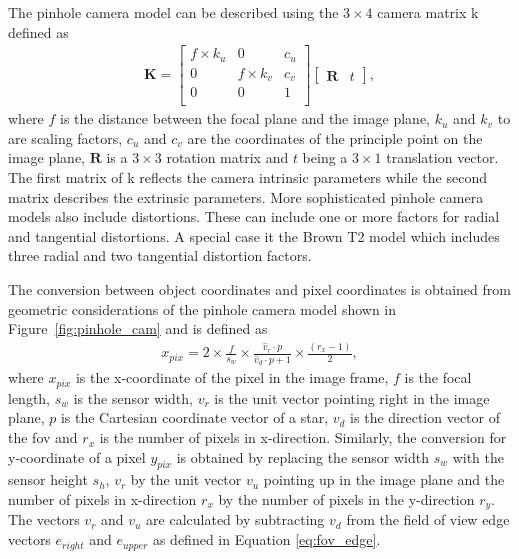 The pinhole camera model can be described using the $3\times4$ camera matrix \gls{k} defined as
\begin{align}
    \textbf{K} = \begin{bmatrix}
        f\times k_u & 0           & c_u \\
        0           & f\times k_v & c_v \\
        0           & 0           & 1   \\
    \end{bmatrix} 
    \begin{bmatrix}
        \textbf{R} & t
    \end{bmatrix}, \label{eq:camera_m}
\end{align}
where $f$ is the distance between the focal plane and the image plane, $k_u$ and $k_v$ to are scaling factors, $c_u$ and $c_v$ are the coordinates of the principle point on the image plane, $\textbf{R}$ is a $3\times3$ rotation matrix and $t$ being a $3\times1$ translation vector. The first matrix of \gls{k} reflects the camera intrinsic parameters while the second matrix describes the extrinsic parameters.
More sophisticated pinhole camera models also include distortions. These can include one or more factors for radial and tangential distortions. A special case it the Brown T2 model which includes three radial and two tangential distortion factors.

The conversion between object coordinates and pixel coordinates is obtained from geometric considerations of the pinhole camera model shown in Figure~\ref{fig:pinhole_cam} and is defined as
\begin{align}
    x_{pix} = 2 \times \frac{f}{s_w} \times \frac{\hat{v}_r \cdot p}{\hat{v}_d \cdot p + 1} \times \frac{(r_x - 1)}{2}, \label{eq:pix_conversion} 
\end{align}
where $x_{pix}$ is the x-coordinate of the pixel in the image frame, $f$ is the focal length, $s_w$ is the sensor width, $v_r$ is the unit vector pointing right in the image plane, $p$ is the Cartesian coordinate vector of a star, $v_d$ is the direction vector of the \gls{fov} and $r_x$ is the number of pixels in x-direction. Similarly, the conversion for y-coordinate of a pixel $y_{pix}$ is obtained by replacing the sensor width $s_w$ with the sensor height $s_h$, $v_r$ by the unit vector $v_u$ pointing up in the image plane and the number of pixels in x-direction $r_x$ by the number of pixels in the y-direction $r_y$. The vectors $v_r$ and $v_u$ are calculated by subtracting $v_d$ from the field of view edge vectors $e_{right}$ and $e_{upper}$ as defined in Equation \ref{eq:fov_edge}.

